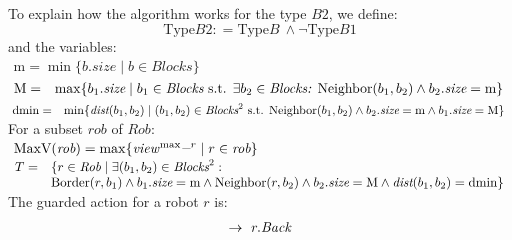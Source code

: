 \medskip To explain how the algorithm works for the type $B2$, 
we define: 
$$\text{Type}B2: = \text{Type}B \ \wedge \neg \text{Type}B1$$
and the variables: \\
$\begin{array}{l }\text{m}= \min \{ b.\textit{size} \mid b \in \textit{Blocks}\}\end{array}$ \\
$\begin{array}{l l }\! \text{M}= &\max \{ b_1.\textit{size} \mid 
b_1 \in \textit{Blocks}  \text{ s.t. } \exists b_2 \in \textit{Blocks: } 
\textrm{Neighbor}(b_1, b_2) \wedge b_2.\textit{size} = \text{m} \} 
\end{array}$ \\
$\begin{array}{l l } \!\text{dmin} = &\min \{ \textit{dist}(b_1, b_2) \mid  
(b_1, b_2) \in \textit{Blocks}^2 \text{ s.t. }
\textrm{Neighbor}(b_1, b_2) \wedge b_2.\textit{size} = \text{m}
\wedge b_1.\textit{size} = \text{M} \} \end{array}$ \\
For a subset $\textit{rob}$ of $\textit{Rob}$: \\
$\begin{array}{l} \!\text{MaxV}(\textit{rob})= \max \{ \mathit{view}^{\max\_r} \mid r \in \textit{rob} \}
\end{array}$\\
$\begin{array}{l l }  T= & \{ r \in \textit{Rob} \mid \exists
  (b_1, b_2) \in \textit{Blocks}^2: \\ & 
  \textrm{Border}(r, b_1)  \wedge b_1.\textit{size} = \text{m} \wedge \textrm{Neighbor}(r, b_2) \wedge
  b_2.\textit{size} = \text{M}  \wedge  \textit{dist}(b_1, b_2) = \text{dmin}\} \end{array}$\\
The guarded action for a robot $r$ is: \\
\begin{gather*}[\text{Type}B2 \wedge r\in T \wedge
\view^{\text{max}\_{r}} = \text{MaxV}(T) \wedge
\exists b \in \textit{Blocks}: \\
(\textrm{Neighbor}(r, b) \wedge b.\textit{size}  = \text{M} \wedge
\textit{dist}(r, b) = \text{dmin})] \rightarrow \ r.\Back
\end{gather*}


